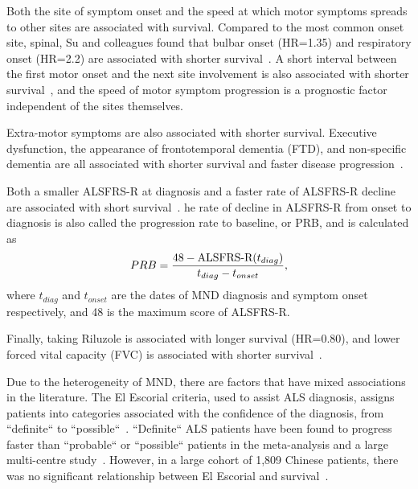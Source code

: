 Both the site of symptom onset and the speed at which motor symptoms spreads to other sites are associated with survival.
Compared to the most common onset site, spinal, Su and colleagues found that bulbar onset (HR=1.35) and respiratory onset (HR=2.2) are associated with shorter survival~\cite{suPredictorsSurvivalPatients2021}.
A short interval between the first motor onset and the next site involvement is also associated with shorter survival~\cite{fujimura-kiyonoOnsetSpreadingPatterns2011a}, and the speed of motor symptom progression is a prognostic factor independent of the sites themselves.

Extra-motor symptoms are also associated with shorter survival.
Executive dysfunction, the appearance of frontotemporal dementia (FTD), and non-specific dementia are all associated with shorter survival and faster disease progression~\cite{suPredictorsSurvivalPatients2021, elaminExecutiveDysfunctionNegative2011}.

Both a smaller ALSFRS-R at diagnosis and a faster rate of ALSFRS-R decline are associated with short survival~\cite{suPredictorsSurvivalPatients2021}.
he rate of decline in ALSFRS-R from onset to diagnosis is also called the progression rate to baseline, or PRB, and is calculated as
\begin{equation}
    PRB = \frac{48-\textnormal{ALSFRS-R}(t_{diag})}{t_{diag}-t_{onset}},
\end{equation}\label{eq:PRB}
where $t_{diag}$ and $t_{onset}$ are the dates of MND diagnosis and symptom onset respectively, and 48 is the maximum score of ALSFRS-R.

Finally, taking Riluzole is associated with longer survival (HR=0.80), and lower forced vital capacity (FVC) is associated with shorter survival~\cite{suPredictorsSurvivalPatients2021}.

Due to the heterogeneity of MND, there are factors that have mixed associations in the literature.
The El Escorial criteria, used to assist ALS diagnosis, assigns patients into categories associated with the confidence of the diagnosis, from ``definite`` to ``possible``~\cite{ludolphRevisionEscorialCriteria2015}.
``Definite`` ALS patients have been found to progress faster than ``probable`` or ``possible`` patients in the meta-analysis and a large multi-centre study~\cite{suPredictorsSurvivalPatients2021, westenengPrognosisPatientsAmyotrophic2018}.
However, in a large cohort of 1,809 Chinese patients, there was no significant relationship between El Escorial and survival~\cite{gaoEpidemiologyFactorsPredicting2021}.

